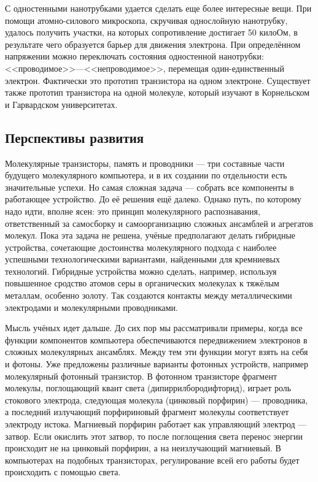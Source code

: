 \documentclass[titlepage, 12pt]{article}
\begin{document}
С одностенными нанотрубками удается сделать еще более интересные вещи. При помощи атомно-силового микроскопа, скручивая однослойную нанотрубку, удалось получить участки, на которых сопротивление достигает 50 килоОм, в результате чего образуется барьер для движения электрона. При определённом напряжении можно переключать состояния одностенной нанотрубки: <<проводимое>>—<<непроводимое>>, перемещая один-единственный электрон. Фактически это прототип транзистора на одном электроне. Существует также прототип транзистора на одной молекуле, который изучают в Корнельском и Гарвардском университетах.



\subsection{Перспективы развития}
Молекулярные транзисторы, память и проводники — три составные части будущего молекулярного компьютера, и в их создании по отдельности есть значительные успехи. Но самая сложная задача — собрать все компоненты в работающее устройство. До её решения ещё далеко. Однако путь, по которому надо идти, вполне ясен: это принцип молекулярного распознавания, ответственный за самосборку и самоорганизацию сложных ансамблей и агрегатов молекул. Пока эта задача не решена, учёные предполагают делать гибридные устройства, сочетающие достоинства молекулярного подхода с наиболее успешными технологическими вариантами, найденными для кремниевых технологий. Гибридные устройства можно сделать, например, используя повышенное сродство атомов серы в органических молекулах к тяжёлым металлам, особенно золоту. Так создаются контакты между металлическими электродами и молекулярными проводниками.

Мысль учёных идет дальше. До сих пор мы рассматривали примеры, когда все функции компонентов компьютера обеспечиваются передвижением электронов в сложных молекулярных ансамблях. Между тем эти функции могут взять на себя и фотоны. Уже предложены различные варианты фотонных устройств, например молекулярный фотонный транзистор. В фотонном транзисторе фрагмент молекулы, поглощающий квант света (дипиррилбородифторид), играет роль стокового электрода, следующая молекула (цинковый порфирин) — проводника, а последний излучающий порфириновый фрагмент молекулы соответствует электроду истока. Магниевый порфирин работает как управляющий электрод — затвор. Если окислить этот затвор, то после поглощения света перенос энергии происходит не на цинковый порфирин, а на неизлучающий магниевый. В компьютерах на подобных транзисторах, регулирование всей его работы будет происходить с помощью света.
\end{document}
